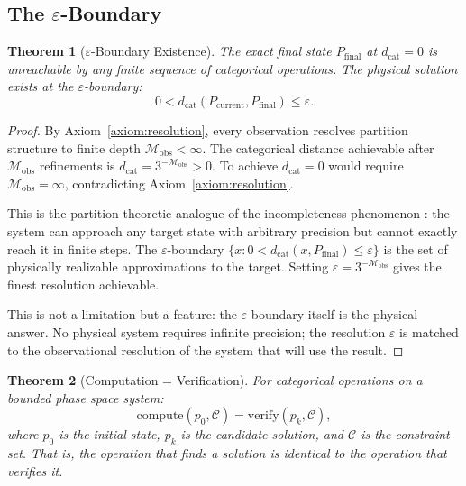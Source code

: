 \documentclass[twocolumn,10pt]{article}
\newtheorem{theorem}{Theorem}[section]
\theoremstyle{remark}
\newcommand{\Depth}{\mathcal{M}}
\newcommand{\eps}{\varepsilon}
\begin{document}
\subsection{The $\eps$-Boundary}

\begin{theorem}[$\eps$-Boundary Existence]
\label{thm:eps_boundary}
The exact final state $P_{\mathrm{final}}$ at $d_{\mathrm{cat}} = 0$ is unreachable by any finite sequence of categorical operations. The physical solution exists at the $\eps$-boundary:
\begin{equation}
0 < d_{\mathrm{cat}}(P_{\mathrm{current}}, P_{\mathrm{final}}) \leq \eps.
\label{eq:eps_boundary}
\end{equation}
\end{theorem}

\begin{proof}
By Axiom~\ref{axiom:resolution}, every observation resolves partition structure to finite depth $\Depth_{\mathrm{obs}} < \infty$. The categorical distance achievable after $\Depth_{\mathrm{obs}}$ refinements is $d_{\mathrm{cat}} = 3^{-\Depth_{\mathrm{obs}}} > 0$. To achieve $d_{\mathrm{cat}} = 0$ would require $\Depth_{\mathrm{obs}} = \infty$, contradicting Axiom~\ref{axiom:resolution}.

This is the partition-theoretic analogue of the incompleteness phenomenon \cite{godel1931}: the system can approach any target state with arbitrary precision but cannot exactly reach it in finite steps. The $\eps$-boundary $\{x : 0 < d_{\mathrm{cat}}(x, P_{\mathrm{final}}) \leq \eps\}$ is the set of physically realizable approximations to the target. Setting $\eps = 3^{-\Depth_{\mathrm{obs}}}$ gives the finest resolution achievable.

This is not a limitation but a feature: the $\eps$-boundary itself is the physical answer. No physical system requires infinite precision; the resolution $\eps$ is matched to the observational resolution of the system that will use the result.
\end{proof}

\begin{theorem}[Computation = Verification]
\label{thm:compute_verify}
For categorical operations on a bounded phase space system:
\begin{equation}
\mathrm{compute}(p_0, \mathcal{C}) = \mathrm{verify}(p_k, \mathcal{C}),
\label{eq:compute_verify}
\end{equation}
where $p_0$ is the initial state, $p_k$ is the candidate solution, and $\mathcal{C}$ is the constraint set. That is, the operation that finds a solution is identical to the operation that verifies it.
\end{theorem}
\end{document}
